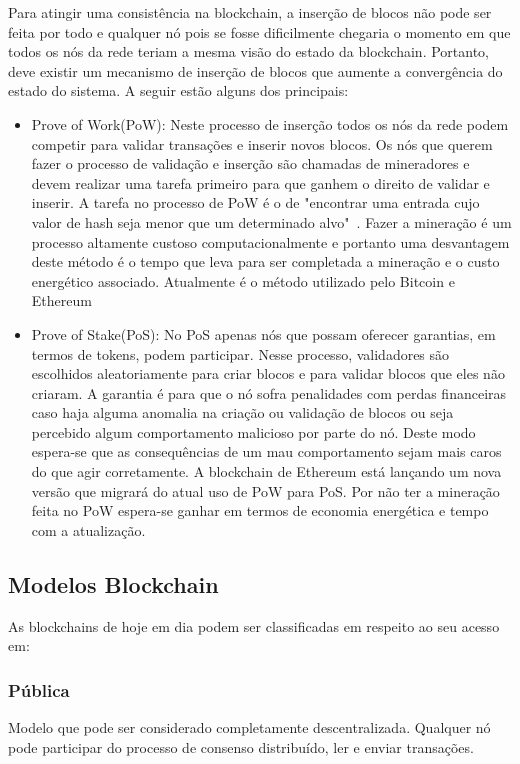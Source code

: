\documentclass[12pt]{article}
\begin{document}
Para atingir uma consistência na blockchain, a inserção de blocos não pode ser feita por todo e qualquer nó pois se fosse dificilmente chegaria o momento em que todos os nós da rede teriam a mesma visão do estado da blockchain. Portanto, deve existir um mecanismo de inserção de blocos que aumente a convergência do estado do sistema. A seguir estão alguns dos principais:
\begin{itemize}
    \item Prove of Work(PoW): Neste processo de inserção todos os nós da rede podem competir para validar transações e inserir novos blocos. Os nós que querem fazer o processo de validação e inserção são chamadas de mineradores e devem realizar uma tarefa primeiro para que ganhem o direito de validar e inserir. A tarefa no processo de PoW é o de "encontrar uma entrada cujo valor de hash seja menor que um determinado alvo"~\cite{miers2019analise}. Fazer a mineração é um processo altamente custoso computacionalmente e portanto uma desvantagem deste método é o tempo que leva para ser completada a mineração e o custo energético associado. Atualmente é o método utilizado pelo Bitcoin e Ethereum
    
    \item Prove of Stake(PoS): No PoS apenas nós que possam oferecer garantias, em termos de tokens, podem participar. Nesse processo, validadores são escolhidos aleatoriamente para criar blocos e para validar blocos que eles não criaram. A garantia é para que o nó sofra penalidades com perdas financeiras caso haja alguma anomalia na criação ou validação de blocos ou seja percebido algum comportamento malicioso por parte do nó. Deste modo espera-se que as consequências de um mau comportamento sejam mais caros do que agir corretamente. A blockchain de Ethereum está lançando um nova versão que migrará do atual uso de PoW para PoS. Por não ter a mineração feita no PoW espera-se ganhar em termos de economia energética e tempo com a atualização.   
\end{itemize}

\subsection{Modelos Blockchain}

As blockchains de hoje em dia podem ser classificadas em respeito ao seu acesso em:

    \subsubsection{Pública}Modelo que pode ser considerado completamente descentralizada. Qualquer nó pode participar do processo de consenso distribuído, ler e enviar transações.
\end{document}
